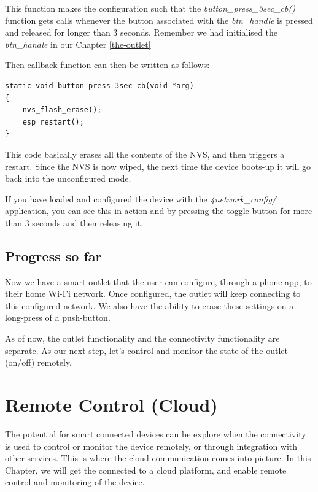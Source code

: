 \documentclass[11pt,fleqn]{book} %
\begin{document}
This function makes the configuration such that the \textit{button\_press\_3sec\_cb()} function gets calls whenever the button associated with the \textit{btn\_handle} is pressed and released for longer than 3 seconds. Remember we had initialised the \textit{btn\_handle} in our Chapter \ref{the-outlet}

Then callback function can then be written as follows:
\begin{verbatim}
static void button_press_3sec_cb(void *arg)
{
    nvs_flash_erase();
    esp_restart();
}
\end{verbatim}

This code basically erases all the contents of the NVS, and then triggers a restart. Since the NVS is now wiped, the next time the device boots-up it will go back into the unconfigured mode. 

If you have loaded and configured the device with the \textit{4network\_config/} application, you can see this in action and by pressing the toggle button for more than 3 seconds and then releasing it.

\section{Progress so far}
Now we have a smart outlet that the user can configure, through a phone app, to their home Wi-Fi network. Once configured, the outlet will keep connecting to this configured network. We also have the ability to erase these settings on a long-press of a push-button.

As of now, the outlet functionality and the connectivity functionality are separate. As our next step, let's control and monitor the state of the outlet (on/off) remotely.



\chapter{Remote Control (Cloud)}

The potential for smart connected devices can be explore when the connectivity is used to control or monitor the device remotely, or through integration with other services. This is where the cloud communication comes into picture. In this Chapter, we will get the connected to a cloud platform, and enable remote control and monitoring of the device.
\end{document}
